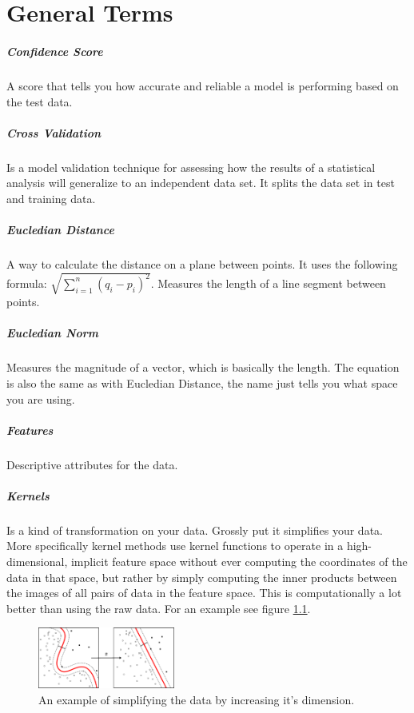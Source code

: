 \chapter{General Terms}\label{chap:general_terms}

\paragraph{Confidence Score} 
A score that tells you how accurate and reliable a model is performing based on the test data.

\paragraph{Cross Validation} 
Is a model validation technique for assessing how the results of a statistical analysis will generalize to an independent data set. It splits the data set in test and training data.

\paragraph{Eucledian Distance}
A way to calculate the distance on a plane between points. It uses the following formula: $\sqrt{\sum\limits_{i=1}^n (q_{i} - p_{i})^2}$. Measures the length of a line segment between points.

\paragraph{Eucledian Norm}
Measures the magnitude of a vector, which is basically the length. The equation is also the same as with Eucledian Distance, the name just tells you what space you are using.

\paragraph{Features} 
Descriptive attributes for the data.

\paragraph{Kernels} 
Is a kind of transformation on your data. Grossly put it simplifies your data. More specifically kernel methods use kernel functions to operate in a high-dimensional, implicit feature space without ever computing the coordinates of the data in that space, but rather by simply computing the inner products between the images of all pairs of data in the feature space. This is computationally a lot better than using the raw data. For an example see figure \ref{fig:kernelmethods}.
\begin{figure}
\centering
\includegraphics[width=0.4\textwidth]{images/kernelmethod.png}
\caption{\label{fig:kernelmethods} An example of simplifying the data by increasing it's dimension.}
\end{figure}

